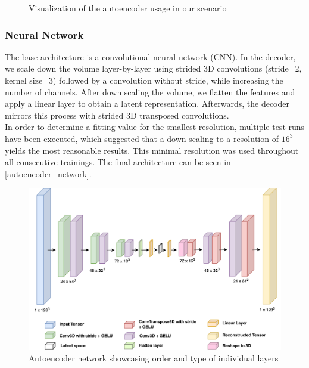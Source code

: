 \begin{figure}[htbp]
  \centering
  
  \caption{Visualization of the autoencoder usage in our scenario}\label{autoencoder_brain}
\end{figure}

\FloatBarrier
\subsubsection{Neural Network}\label{autoencoder_network}
The base architecture is a convolutional neural network (CNN). In the decoder, we scale down the volume layer-by-layer using strided 3D convolutions (stride=2, kernel size=3) followed by a convolution without stride, while increasing the number of channels. After down scaling the volume, we flatten the features and apply a linear layer to obtain a latent representation. Afterwards, the decoder mirrors this process with strided 3D transposed convolutions.\\
In order to determine a fitting value for the smallest resolution, multiple test runs have been executed, which suggested that a down scaling to a resolution of $16^3$ yields the most reasonable results. This minimal resolution was used throughout all consecutive trainings. 
The final architecture can be seen in \autoref{autoencoder_network}.

\begin{figure}[htbp]
  \centering
  \includegraphics[width=450pt]{figures/autoencoder_network}
  \caption{Autoencoder network showcasing order and type of individual layers}\label{fig_autoencoder_network}
\end{figure}
\FloatBarrier

